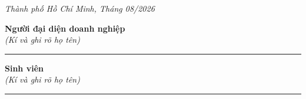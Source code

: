 
\vspace{1cm}
\textit{Thành phố Hồ Chí Minh, Tháng 08/2026}
\begin{center}

\begin{minipage}[t]{0.4\textwidth}
    \centering
    \textbf{Người đại diện doanh nghiệp}\\[0.2cm]
    \textit{(Kí và ghi rõ họ tên)}

    \vspace{2.5cm}

    \rule{0.8\linewidth}{0.4pt}
\end{minipage}
\hfill
\begin{minipage}[t]{0.4\textwidth}
    \centering
    \textbf{Sinh viên}\\[0.2cm]
    \textit{(Kí và ghi rõ họ tên)}

    \vspace{2.5cm}

    \rule{0.8\linewidth}{0.4pt}
\end{minipage}
\hfill
\end{center}